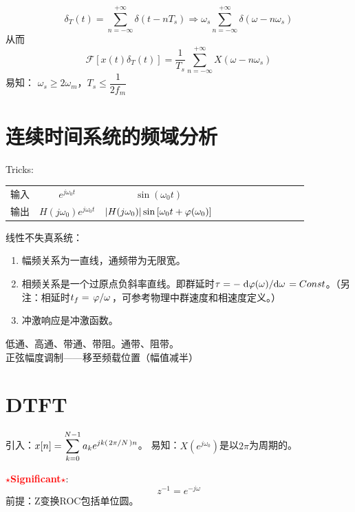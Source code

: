 \documentclass{article}
\def\suminf#1{\sum_{#1=-\infty}^{+\infty}}
\def\ft{\mathcal{F}}
\begin{document}
\begin{defi}[采样]
	\[
		\delta_T(t)=\suminf{n}\delta(t-nT_s)\Longrightarrow
		\omega_s\suminf{n}\delta(\omega-n\omega_s)
	\]
	从而
	\[
		\ft[x(t)\delta_T(t)]=
		\frac{1}{T_s}\suminf{n}X(\omega-n\omega_s)
	\] 
	易知：
	$\omega_s\ge 2\omega_m$，$T_s\le\dfrac{1}{2f_m}$
\end{defi}




\section{连续时间系统的频域分析}

\begin{thm}Tricks:
	\begin{table}[H]
		\centering
		\begin{tabular}{c|ccccccccccc}
			输入 & $e^{j\omega_0t}$ & $\sin(\omega_0t)$
			\\[7pt]
			输出 & $H(j\omega_0)e^{j\omega_0t}$ & $\abs{H(j\omega_0)}\sin\qty[\omega_0t+\varphi(\omega_0)]$
		\end{tabular}
	\end{table}
\end{thm}


\begin{prt}线性不失真系统：
	\begin{enumerate}
		\item 幅频关系为一直线，通频带为无限宽。
		\item 相频关系是一个过原点负斜率直线。即群延时$\tau=-\dv*{\varphi(\omega)}{\omega}=Const$。（另注：相延时$t_f=\flatfrac{\varphi}{\omega}$，可参考物理中群速度和相速度定义。）
		\item 冲激响应是冲激函数。
	\end{enumerate}    
\end{prt}

\begin{defi}
    低通、高通、带通、带阻。通带、阻带。
	\\
	正弦幅度调制——移至频载位置（幅值减半）
\end{defi}






\section{DTFT}
引入：$\displaystyle x[n]=\sum_{k=0}^{N-1}a_ke^{jk\qty(\flatfrac{2\pi}{N})n}$。
易知：$X(e^{j\omega_0})$是以$2\pi$为周期的。
\begin{prt}
	\textcolor{red}{{\textbf{$\star$Significant$\star$}}}:
	\[
		z^{-1}=e^{-j\omega}
	\]
	前提：Z变换ROC包括单位圆。
\end{prt}
\end{document}
